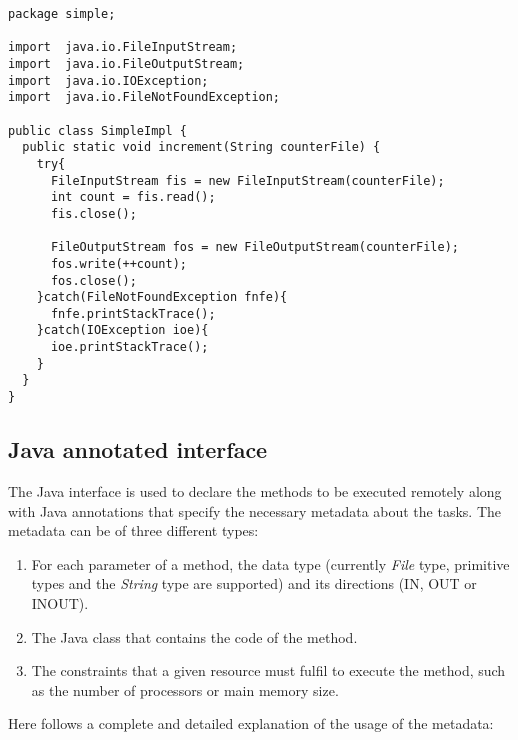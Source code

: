 \begin{lstlisting}
package simple;

import  java.io.FileInputStream;
import  java.io.FileOutputStream;
import  java.io.IOException;
import  java.io.FileNotFoundException;

public class SimpleImpl {
  public static void increment(String counterFile) {
    try{
      FileInputStream fis = new FileInputStream(counterFile);
      int count = fis.read();
      fis.close();
      
      FileOutputStream fos = new FileOutputStream(counterFile);
      fos.write(++count);
      fos.close();
    }catch(FileNotFoundException fnfe){
      fnfe.printStackTrace();
    }catch(IOException ioe){
      ioe.printStackTrace();
    }
  }
}
\end{lstlisting}


\subsection{Java annotated interface}

The Java interface is used to declare the methods to be executed remotely along with Java annotations that
specify the necessary metadata about the tasks. The metadata can be of three different types:

\begin{enumerate}
 \item For each parameter of a method, the data type (currently {\it File} type, primitive types and the {\it String} type are supported) and its directions (IN, OUT or INOUT).
 \item The Java class that contains the code of the method.
 \item The constraints that a given resource must fulfil to execute the method, such as the number of processors or main memory size.
\end{enumerate}

Here follows a complete and detailed explanation of the usage of the metadata:

